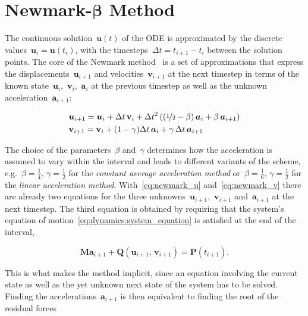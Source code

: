 \section{Newmark-$\boldsymbol{\beta}$ Method}

The continuous solution~$\boldsymbol{u}(t)$ of the ODE is approximated by the discrete values~$\boldsymbol{u}_i = \boldsymbol{u}(t_{i})$, with the timesteps~$\Delta t = t_{i+1} - t_{i}$ between the solution points.
The core of the Newmark method~\cite{bib:bathe2006} is a set of approximations that express the displacements~$\boldsymbol{u}_{i+1}$ and velocities~$\mathbf{v}_{i+1}$ at the next timestep in terms of the known state~$\boldsymbol{u}_{i}$,~$\mathbf{v}_{i}$,~$\boldsymbol{a}_{i}$ at the previous timestep as well as the unknown acceleration~$\boldsymbol{a}_{i+1}$:

\begin{align}
&\boldsymbol{u}_{i+1} = \boldsymbol{u}_{i} + \Delta t\,\mathbf{v}_{i} + \Delta t^2 \left( \left(\nicefrac{1}{2} - \beta\right)\boldsymbol{a}_{i} + \beta\,\boldsymbol{a}_{i+1} \right) \label{eq:newmark_u} \\
&\mathbf{v}_{i+1} = \mathbf{v}_{i} + (1 - \gamma)\Delta t\,\boldsymbol{a}_{i} + \gamma\,\Delta t\,\boldsymbol{a}_{i+1} \label{eq:newmark_v}
\end{align}

The choice of the parameters~$\beta$ and~$\gamma$ determines how the acceleration is assumed to vary within the interval and leads to different variants of the scheme, e.g.~$\beta = \frac{1}{4},\,\gamma = \frac{1}{2}$ for the \textit{constant average acceleration method} or~$\beta = \frac{1}{6},\,\gamma = \frac{1}{2}$ for the \textit{linear acceleration method}.
With~\eqref{eq:newmark_u} and~\eqref{eq:newmark_v} there are already two equations for the three unknowns~$\boldsymbol{u}_{i+1}$,~$\mathbf{v}_{i+1}$ and~$\boldsymbol{a}_{i+1}$ at the next timestep.
The third equation is obtained by requiring that the system's equation of motion~\eqref{eq:dynamics:system_equation} is satisfied at the end of the interval,

\begin{equation}
\boldsymbol{M}\boldsymbol{a}_{i+1} + \boldsymbol{Q}(\boldsymbol{u}_{i+1},\,\mathbf{v}_{i+1}) = \boldsymbol{P}(t_{i+1}). \label{eq:newmark_balance}
\end{equation}

This is what makes the method implicit, since an equation involving the current state as well as the yet unknown next state of the system has to be solved.
Finding the accelerations~$\boldsymbol{a}_{i+1}$ is then equivalent to finding the root of the residual forces


